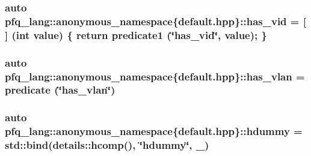 \hypertarget{namespacepfq__lang_1_1anonymous__namespace_02default_8hpp_03_adddd2dea56164719f2853af158911a80}{
\subsubsection[{has\+\_\+vid}]{\setlength{\rightskip}{0pt plus 5cm}auto pfq\+\_\+lang\+::anonymous\+\_\+namespace\{default.\+hpp\}\+::has\+\_\+vid = \mbox{[}$\,$\mbox{]} (int value) \{ return {\bf predicate1} (\char`\"{}has\+\_\+vid\char`\"{}, value); \}}}\label{namespacepfq__lang_1_1anonymous__namespace_02default_8hpp_03_adddd2dea56164719f2853af158911a80}
\hypertarget{namespacepfq__lang_1_1anonymous__namespace_02default_8hpp_03_a30a0c8d9bcd28cd17c6c1699c3339c3f}{
\subsubsection[{has\+\_\+vlan}]{\setlength{\rightskip}{0pt plus 5cm}auto pfq\+\_\+lang\+::anonymous\+\_\+namespace\{default.\+hpp\}\+::has\+\_\+vlan = {\bf predicate} (\char`\"{}has\+\_\+vlan\char`\"{})}}\label{namespacepfq__lang_1_1anonymous__namespace_02default_8hpp_03_a30a0c8d9bcd28cd17c6c1699c3339c3f}
\hypertarget{namespacepfq__lang_1_1anonymous__namespace_02default_8hpp_03_a4e7cf4874b42c5722f420fc54f360242}{
\subsubsection[{hdummy}]{\setlength{\rightskip}{0pt plus 5cm}auto pfq\+\_\+lang\+::anonymous\+\_\+namespace\{default.\+hpp\}\+::hdummy = std\+::bind(details\+::hcomp(), \char`\"{}hdummy\char`\"{}, \+\_)}}\label{namespacepfq__lang_1_1anonymous__namespace_02default_8hpp_03_a4e7cf4874b42c5722f420fc54f360242}
